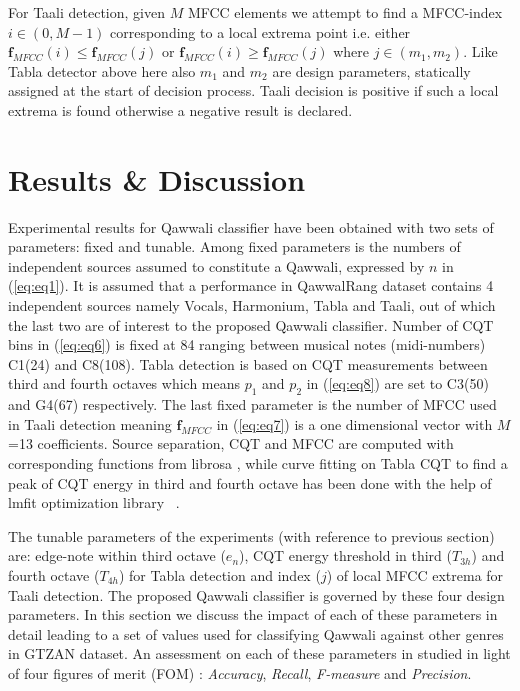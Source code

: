 \documentclass{article}
\begin{document}
For Taali detection, given $M$ MFCC elements we attempt to find a MFCC-index $i \in (0, M-1)$ corresponding to a local extrema point i.e. either $\boldsymbol{f}_{MFCC}(i) \leq \boldsymbol{f}_{MFCC}(j)$ or $\boldsymbol{f}_{MFCC}(i) \geq \boldsymbol{f}_{MFCC}(j)$ where $j \in (m_{1}, m_{2})$. Like Tabla detector above here also $m_{1}$ and $m_{2}$ are design parameters, statically assigned at the start of decision process. Taali decision is positive if such a local extrema is found otherwise a negative result is declared.

\section{Results \& Discussion}\label{sec:result}
Experimental results for Qawwali classifier have been obtained with two sets of parameters: fixed and tunable. Among fixed parameters is the numbers of independent sources assumed to constitute a Qawwali, expressed by ${n}$ in (\ref{eq:eq1}). It is assumed that a performance in QawwalRang dataset contains 4 independent sources namely Vocals, Harmonium, Tabla and Taali, out of which the last two are of interest to the proposed Qawwali classifier. Number of CQT bins in (\ref{eq:eq6}) is fixed at 84 ranging between musical notes (midi-numbers) C1(24) and C8(108). Tabla detection is based on CQT measurements between third and fourth octaves which means $p_{1}$ and $p_{2}$ in (\ref{eq:eq8}) are set to C3(50) and G4(67) respectively. The last fixed parameter is the number of MFCC used in Taali detection meaning $\boldsymbol{f}_{MFCC}$ in (\ref{eq:eq7}) is a one dimensional vector with $M$=13 coefficients. Source separation, CQT and MFCC are computed with corresponding functions from librosa \citep{brian_mcfee_2022_6097378}, while curve fitting on Tabla CQT to find a peak of CQT energy in third and fourth octave has been done with the help of lmfit optimization library ~\citep{newville_matthew_2014}.

The tunable parameters of the experiments (with reference to previous section) are: edge-note within third octave ($e_{n}$), CQT energy threshold in third ($T_{3h}$) and fourth octave ($T_{4h}$) for Tabla detection and index ($j$) of local MFCC extrema for Taali detection. The proposed Qawwali classifier is governed by these four design parameters. In this section we discuss the impact of each of these parameters in detail leading to a set of values used for classifying Qawwali against other genres in GTZAN dataset. An assessment on each of these parameters in studied in light of four figures of merit (FOM) \citep{music_genre_survey}: \textit{Accuracy}, \textit{Recall}, \textit{F-measure} and \textit{Precision}.
\end{document}
